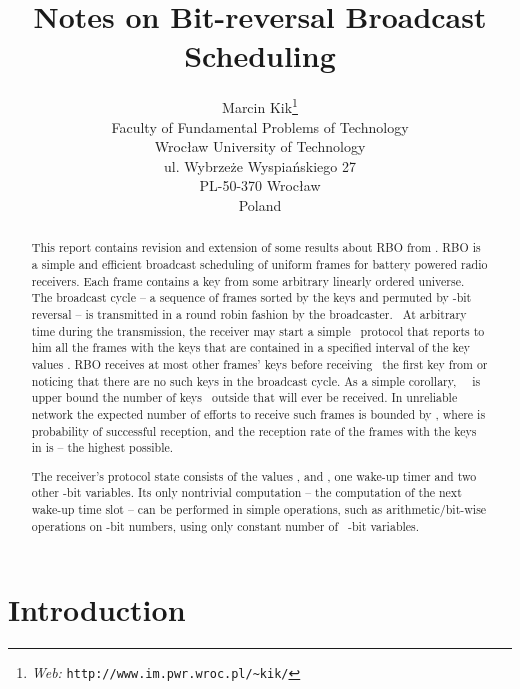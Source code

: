 \documentclass{article}
\newcommand{\homepage}[1]{{\textit{Web:} \texttt{#1}}}
\begin{document}
\title{Notes on Bit-reversal Broadcast Scheduling}\author{Marcin
Kik\thanks{\homepage{http://www.im.pwr.wroc.pl/\~{ }kik/}}\\
Faculty of Fundamental Problems of Technology\\
Wroc{\l}aw University of Technology\\
ul. Wybrze\.ze Wyspia\'nskiego 27\\
PL-50-370 Wroc{\l}aw\\
Poland}\maketitle

\begin{abstract}
  This report contains revision and extension of some results about RBO from
  {\cite{DBLP:journals/corr/abs-1108-5095}}.
  RBO is a simple and efficient broadcast scheduling of  uniform
  frames for battery powered radio receivers. Each frame contains a key from
  some arbitrary linearly ordered universe. The broadcast cycle -- a sequence
  of frames sorted by the keys and permuted by -bit reversal -- is
  transmitted in a round robin fashion by the broadcaster. \ At arbitrary time
  during the transmission, the receiver may start a simple \ protocol that
  reports to him all the frames with the keys that are contained in a
  specified interval of the key values . RBO receives at
  most  other frames' keys before receiving \ the first key from
   or noticing that there are no such keys in the
  broadcast cycle. As a simple corollary, \  \ is upper bound the
  number of keys \ outside  that will ever be received.
  In unreliable network the expected number of efforts to receive such frames
  is bounded by , where  is probability of
  successful reception, and the reception rate of the frames with the keys in
   is  -- the highest possible.
  
  The receiver's protocol state consists of the values ,  and
  , one wake-up timer and two other -bit variables. Its only
  nontrivial computation -- the computation of the next wake-up time slot --
  can be performed in  simple operations, such as arithmetic/bit-wise
  operations on -bit numbers, using only constant number of \ -bit
  variables.
\end{abstract}



\section{Introduction}
\end{document}
